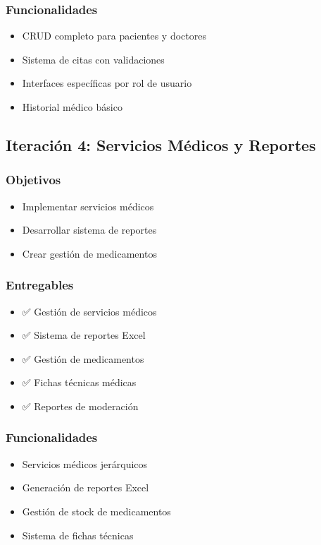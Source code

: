 \documentclass[12pt,a4paper]{article}
\begin{document}
\subsubsection{Funcionalidades}
\begin{itemize}
    \item CRUD completo para pacientes y doctores
    \item Sistema de citas con validaciones
    \item Interfaces específicas por rol de usuario
    \item Historial médico básico
\end{itemize}

\subsection{Iteración 4: Servicios Médicos y Reportes}

\subsubsection{Objetivos}
\begin{itemize}
    \item Implementar servicios médicos
    \item Desarrollar sistema de reportes
    \item Crear gestión de medicamentos
\end{itemize}

\subsubsection{Entregables}
\begin{itemize}
    \item ✅ Gestión de servicios médicos
    \item ✅ Sistema de reportes Excel
    \item ✅ Gestión de medicamentos
    \item ✅ Fichas técnicas médicas
    \item ✅ Reportes de moderación
\end{itemize}

\subsubsection{Funcionalidades}
\begin{itemize}
    \item Servicios médicos jerárquicos
    \item Generación de reportes Excel
    \item Gestión de stock de medicamentos
    \item Sistema de fichas técnicas
\end{itemize}
\end{document}
